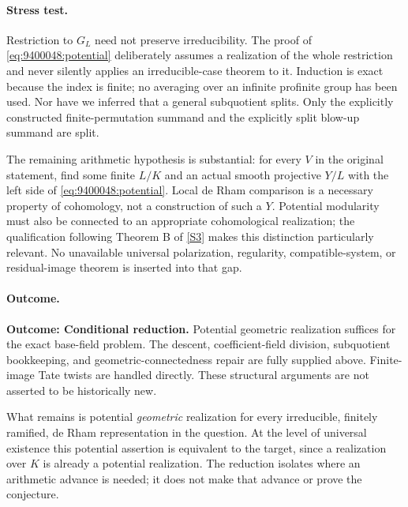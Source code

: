 \documentclass[11pt,a4paper]{article}
\newcommand{\sref}[2]{\hyperlink{source:#1:#2}{[S#2]}}
\numberwithin{equation}{section}
\begin{document}
\paragraph{Stress test.}
Restriction to $G_L$ need not preserve irreducibility. The proof of
\eqref{eq:9400048:potential} deliberately assumes a realization of the whole
restriction and never silently applies an irreducible-case theorem to it.
Induction is exact because the index is finite; no averaging over an
infinite profinite group has been used. Nor have we inferred that a general
subquotient splits. Only the explicitly constructed finite-permutation
summand and the explicitly split blow-up summand are split.

The remaining arithmetic hypothesis is substantial: for every $V$ in the
original statement, find some finite $L/K$ and an actual smooth projective
$Y/L$ with the left side of \eqref{eq:9400048:potential}. Local de Rham comparison
is a necessary property of cohomology, not a construction of such a $Y$.
Potential modularity must also be connected to an appropriate cohomological
realization; the qualification following Theorem B of \sref{9400048}{3} makes
this distinction particularly relevant. No unavailable universal
polarization, regularity, compatible-system, or residual-image theorem is
inserted into that gap.

\paragraph{Outcome.}
\textbf{Outcome: Conditional reduction.}
Potential geometric realization suffices for the exact base-field problem.
The descent, coefficient-field division, subquotient bookkeeping, and
geometric-connectedness repair are fully supplied above. Finite-image Tate
twists are handled directly. These structural arguments are not asserted
to be historically new.

What remains is potential \emph{geometric} realization for every irreducible,
finitely ramified, de Rham representation in the question. At the level of
universal existence this potential assertion is equivalent to the target,
since a realization over $K$ is already a potential realization. The
reduction isolates where an arithmetic advance is needed; it does not make
that advance or prove the conjecture.
\end{document}
